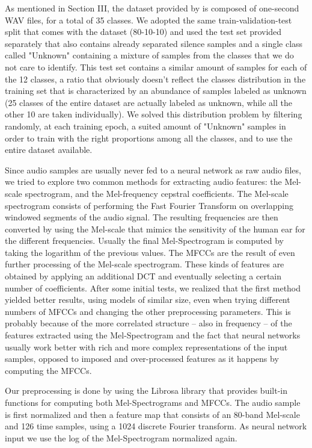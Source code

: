As mentioned in Section III, the dataset provided by \cite{5} is composed of one-second WAV files, for a total of 35 classes. We adopted the same train-validation-test split that comes with the dataset (80-10-10) and used the test set provided separately \cite{6} that also contains already separated silence samples and a single class called "Unknown" containing a mixture of samples from the classes that we do not care to identify.
This test set contains a similar amount of samples for each of the 12 classes, a ratio that obviously doesn't reflect the classes distribution in the training set that is characterized by an abundance of samples labeled as unknown (25 classes of the entire dataset are actually labeled as unknown, while all the other 10 are taken individually). We solved this distribution problem by filtering randomly, at each training epoch, a suited amount of "Unknown" samples in order to train with the right proportions among all the classes, and to use the entire dataset available.


Since audio samples are usually never fed to a neural network as raw audio files, we tried to explore two common methods for extracting audio features: the Mel-scale spectrogram, and the Mel-frequency cepstral coefficients.
The Mel-scale spectrogram consists of performing the Fast Fourier Transform on overlapping windowed segments of the audio signal. The resulting frequencies are then converted by using the Mel-scale that mimics the sensitivity of the human ear for the different frequencies. Usually the final Mel-Spectrogram is computed by taking the logarithm of the previous values.
The MFCCs are the result of even further processing of the Mel-scale spectrogram. These kinds of features are obtained by applying an additional DCT and eventually selecting a certain number of coefficients.
After some initial tests, we realized that the first method yielded better results, using models of similar size, even when trying different numbers of MFCCs and changing the other preprocessing parameters. This is probably because of the more correlated structure -- also in frequency -- of the features extracted using the Mel-Spectrogram and the fact that neural networks usually work better with rich and more complex representations of the input samples, opposed to imposed and over-processed features as it happens by computing the MFCCs.


Our preprocessing is done by using the Librosa library \cite{7} that provides built-in functions for computing both Mel-Spectrograms and MFCCs. The audio sample is first normalized and then a feature map that consists of an 80-band Mel-scale and 126 time samples, using a 1024 discrete Fourier transform. As neural network input we use the log of the Mel-Spectrogram normalized again.


